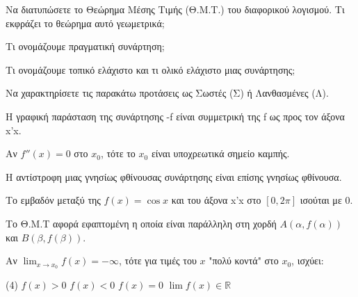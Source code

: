 \documentclass[11pt,a4paper]{article}
\newcommand{\kerkissans}[1]{{\fontfamily{maksf}\selectfont \textbf{#1}}}
\renewcommand{\textdexiakeraia}{}
\newcommand\themanum{A}
\newcounter{thema}[section]
\renewcommand{\thethema}{\arabic{thema}}
\newcommand{\Thema}{\refstepcounter{thema}{\textbf{\textcolor{black}{\faPenSquare\ \  \large \kerkissans{\textbf{\thethemaο\hspace{2mm}Θέμα}}}}}\hspace{0mm}}{}
\newenvironment{thema}[1]
{\begin{tcolorbox}[title=\Thema\kerkissans{\textbf{\large{  #1}}},breakable,
enhanced standard,titlerule=0pt,toprule=0pt, rightrule=0pt, bottomrule=0pt,
colback=white,left=0mm,top=1mm,bottom=0mm,
boxrule=0pt,
colframe=white,leftrule=0mm,sharp corners,coltitle=black]
\renewcommand{\themanum}{#1}}
{\end{tcolorbox}}
\begin{document}
\begin{thema}{A}
\begin{erwthma}
    \item Να διατυπώσετε το Θεώρημα Μέσης Τιμής (Θ.Μ.Τ.) του διαφορικού λογισμού. Τι εκφράζει το θεώρημα αυτό γεωμετρικά;
    \item Τι ονομάζουμε πραγματική συνάρτηση;
    \item Τι ονομάζουμε τοπικό ελάχιστο και τι ολικό ελάχιστο μιας συνάρτησης;
    \item Να χαρακτηρίσετε τις παρακάτω προτάσεις ως Σωστές (Σ) ή Λανθασμένες (Λ).
    \begin{alist}
        \item Η γραφική παράσταση της συνάρτησης -f είναι συμμετρική της f ως προς τον άξονα x'x.
        \item Αν $f''(x) = 0$ στο $x_0$, τότε το $x_0$ είναι υποχρεωτικά σημείο καμπής.
        \item Η αντίστροφη μιας γνησίως φθίνουσας συνάρτησης είναι επίσης γνησίως φθίνουσα.
        \item Το εμβαδόν μεταξύ της $f(x) = \cos x$ και του άξονα x'x στο $[0, 2\pi]$ ισούται με 0.
        \item Το Θ.Μ.Τ αφορά εφαπτομένη η οποία είναι παράλληλη στη χορδή $A(\alpha, f(\alpha))$ και $B(\beta, f(\beta))$.
    \end{alist}
    \item Αν $\lim_{x\to x_0} f(x) = -\infty$, τότε για τιμές του $x$ "πολύ κοντά" στο $x_0$, ισχύει:
    \begin{tasks}[label=\let\textdexiakeraia\relax\alph*.](4)
        \task $f(x) > 0$
        \task $f(x) < 0$
        \task $f(x) = 0$
        \task $\lim f(x) \in \mathbb{R}$
    \end{tasks}
\end{erwthma}
\end{thema}
\vspace{1cm}
\end{document}
